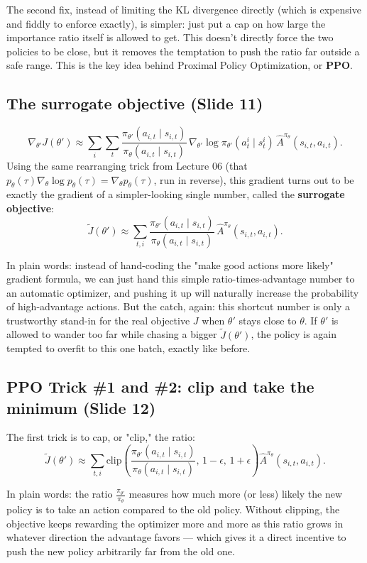 \documentclass[11pt]{article}
\begin{document}
The second fix, instead of limiting the KL divergence directly (which is expensive and fiddly to enforce exactly), is simpler: just put a cap on how large the importance ratio itself is allowed to get. This doesn't directly force the two policies to be close, but it removes the temptation to push the ratio far outside a safe range. This is the key idea behind Proximal Policy Optimization, or \textbf{PPO}.

\subsection{The surrogate objective (Slide 11)}
$$\nabla_{\theta'}J(\theta') \approx \sum_{i}\sum_t \frac{\pi_{\theta'}(a_{i,t}\mid s_{i,t})}{\pi_\theta(a_{i,t}\mid s_{i,t})}\,\nabla_{\theta'}\log\pi_{\theta'}(a^i_t\mid s^i_t)\,\hat A^{\pi_\theta}(s_{i,t},a_{i,t}).$$
Using the same rearranging trick from Lecture 06 (that $p_\theta(\tau)\nabla_\theta\log p_\theta(\tau) = \nabla_\theta p_\theta(\tau)$, run in reverse), this gradient turns out to be exactly the gradient of a simpler-looking single number, called the \textbf{surrogate objective}:
$$\tilde J(\theta') \approx \sum_{t,i} \frac{\pi_{\theta'}(a_{i,t}\mid s_{i,t})}{\pi_\theta(a_{i,t}\mid s_{i,t})}\,\hat A^{\pi_\theta}(s_{i,t},a_{i,t}).$$

In plain words: instead of hand-coding the "make good actions more likely" gradient formula, we can just hand this simple ratio-times-advantage number to an automatic optimizer, and pushing it up will naturally increase the probability of high-advantage actions. But the catch, again: this shortcut number is only a trustworthy stand-in for the real objective $J$ when $\theta'$ stays close to $\theta$. If $\theta'$ is allowed to wander too far while chasing a bigger $\tilde J(\theta')$, the policy is again tempted to overfit to this one batch, exactly like before.

\subsection{PPO Trick \#1 and \#2: clip and take the minimum (Slide 12)}
The first trick is to cap, or "clip," the ratio:
$$\tilde J(\theta') \approx \sum_{t,i} \text{clip}\!\left(\frac{\pi_{\theta'}(a_{i,t}\mid s_{i,t})}{\pi_\theta(a_{i,t}\mid s_{i,t})},\,1-\epsilon,\,1+\epsilon\right)\hat A^{\pi_\theta}(s_{i,t},a_{i,t}).$$

In plain words: the ratio $\frac{\pi_{\theta'}}{\pi_\theta}$ measures how much more (or less) likely the new policy is to take an action compared to the old policy. Without clipping, the objective keeps rewarding the optimizer more and more as this ratio grows in whatever direction the advantage favors — which gives it a direct incentive to push the new policy arbitrarily far from the old one.
\end{document}

